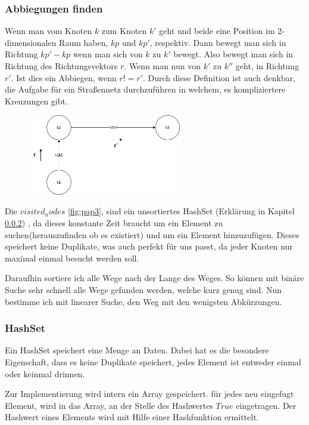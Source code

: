\documentclass[a4paper,12pt,arial]{scrartcl}
\begin{document}
\newpage
\subsubsection{Abbiegungen finden}
Wenn man vom Knoten $k$ zum Knoten $k'$ geht und beide eine Position im 2-dimensionalen Raum haben, $kp$ und $kp'$, respektiv.
Dann bewegt man sich in Richtung $kp'-kp$ wenn man sich von  $k$ zu $k'$ bewegt. Also bewegt man sich in Richtung des Richtungsvektors $r$. Wenn man nun von $k'$ zu $k''$ geht, in Richtung $r'$.
Ist dies ein Abbiegen, wenn $r != r'$.
Durch diese Definition ist auch denkbar, die Aufgabe für ein Straßennetz durchzuführen in welchem, es kompliziertere Kreuzungen gibt.
\begin{figure}[h!]
    \centering
    \includegraphics[width=0.6\textwidth]{AbbiegenBWinf.png}
    \caption{}
    \label{fig:abbiegen}
\end{figure}


Die $visited_nodes$ \ref{fig:pap3}, sind ein unsortiertes HashSet (Erklärung in Kapitel \ref{sec:HashSet}) , da dieses konstante Zeit braucht um ein Element zu suchen(herauszufinden ob es existiert) und um ein Element hinzuzufügen.
Dieses speichert keine Duplikate, was auch perfekt für uns passt, da jeder Knoten nur maximal einmal besucht werden soll.
\par
Daraufhin sortiere ich alle Wege nach der Lange des Weges. So können mit binäre Suche sehr schnell alle Wege gefunden werden, welche kurz genug sind. Nun bestimme ich mit linearer Suche, den Weg mit den wenigsten Abkürzungen.
\subsubsection{HashSet}\label{sec:HashSet}
Ein HashSet speichert eine Menge an Daten. Dabei hat es die besondere Eigenschaft, dass es keine Duplikate speichert, jedes Element ist entweder einmal oder keinmal drinnen.

Zur Implementierung wird intern ein Array gespeichert. für jedes neu eingefugt Element, wird in das Array, an der Stelle des Hashwertes  $True$ eingetragen.
Der Hashwert eines Elements wird mit Hilfe einer Hashfunktion ermittelt.
\end{document}
